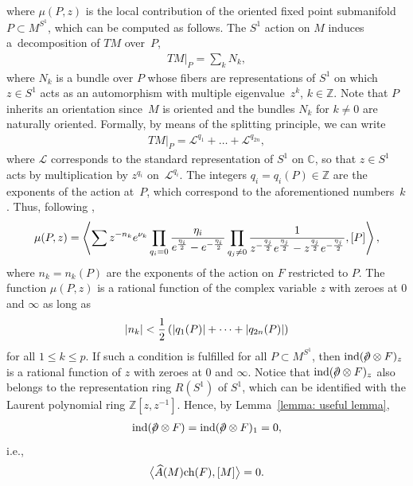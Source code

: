 \documentclass[10pt,a4paper]{amsart}
\newcommand{\A}{\mbox{$\widehat A$}}
\newcommand{\ind}{\mbox{\rm ind}}
\newcommand{\ch}{\mbox{\rm ch}}
\newcommand{\dirac}{/\kern-5pt\partial}
\numberwithin{equation}{section}
\begin{document}
where $\mu(P,z)$ is the local contribution of the oriented f\/ixed point submanifold $P\subset M^{S^1}$, which can be computed as follows. The $S^1$ action on $M$ induces a~decomposition of $TM$ over~$P$,
\begin{gather}
TM\vert_{P}= \sum_{k} N_k,\label{eq: decomposition1}
\end{gather}
where $N_k$ is a bundle over $P$ whose f\/ibers are representations of $S^1$ on which $z\in S^1$ acts as an automorphism with multiple eigenvalue~$z^k$, $k\in\mathbb{Z}$. Note that $P$ inherits an orientation since~$M$ is oriented and the bundles $N_k$ for $k\not=0$ are naturally oriented. Formally, by means of the splitting principle, we can write
\begin{gather}
 TM\vert_{P}= \mathcal{L}^{q_1}+\dots + \mathcal{L}^{q_{2n}},\label{eq: decomposition2}
\end{gather}
where $\mathcal{L}$ corresponds to the standard representation of $S^1$ on $\mathbb{C}$, so that $z\in S^1$ acts by multiplication by $z^{q_i}$ on~$\mathcal{L}^{q_i}$. The integers $q_i=q_i(P)\in \mathbb{Z}$ are the exponents of the action at~$P$, which correspond to the aforementioned numbers~$k$. Thus, following \cite[p.~67]{Hirzebruch},
\begin{gather*}\mu(P,z)= \left\langle \sum z^{-n_k}e^{\nu_k} \prod_{q_i=0}
{ \eta_i \over e^{\eta_i\over2}-e^{-{\eta_i\over2}}} \prod_{q_j\not = 0}
{1 \over z^{-{q_j\over2}}e^{\eta_j\over2}-z^{q_j\over2}e^{-{\eta_j\over2}}},[P]\right\rangle ,
\end{gather*}
where $n_k=n_k(P)$ are the exponents of the action on $F$ restricted to $P$. The function $\mu(P,z)$ is a rational function of the complex variable $z$ with zeroes at $0$ and $\infty$ as long as
\begin{gather}
|n_k|< {1\over 2}\left(|q_1(P)|+\dots + |q_{2n}(P)|\right)\label{eq: fundamental inequality}
\end{gather}
for all $1\leq k\leq p$. If such a condition is fulf\/illed for all $P\subset M^{S^1}$, then $\ind(\dirac\otimes F)_z$ is a rational function of $z$ with zeroes at $0$ and $\infty$. Notice that $\ind(\dirac\otimes F)_z$ also belongs to the representation ring $R(S^1)$ of $S^1$, which can be identif\/ied with the Laurent polynomial ring $\mathbb{Z}[z, z^{-1}]$. Hence, by Lemma~\ref{lemma: useful lemma},
\begin{gather*}\ind(\dirac\otimes F)=\ind(\dirac\otimes F)_1 =0,\end{gather*}
i.e.,
\begin{gather*}\big\langle \A(M)\ch(F),[M]\big\rangle =0.\end{gather*}
\end{document}
